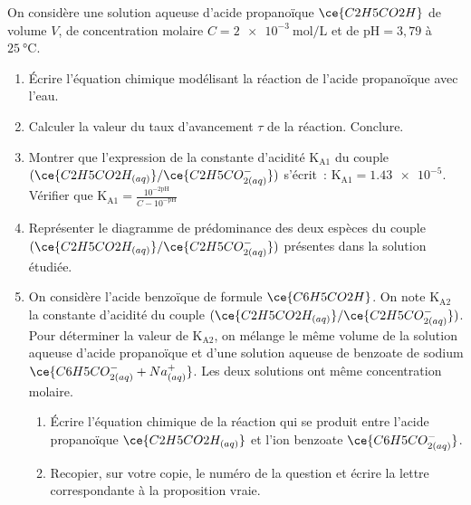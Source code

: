 On considère une solution aqueuse d'acide propanoïque $\ce{C2H5CO2H}$ de volume
$V$, de concentration molaire $C=\qty{2e-3}{\mol\per\L}$ et de
$\mathrm{pH}=3,79$ à $\qty{25}{\degreeCelsius}$.

\begin{enumerate}
    \item Écrire l'équation chimique modélisant la réaction de l'acide
          propanoïque avec l'eau.
    \item Calculer la valeur du taux d'avancement $\tau$ de la réaction.
          Conclure.
    \item Montrer que l'expression de la constante d'acidité $\mathrm{K_{A1}}$
          du couple $(\ce{C2H5CO2H_{(aq)}}/\ce{C2H5CO^-_{2(aq)}})$ s'écrit~:
          $\mathrm{K_{A1}}=\num{1.43e-5}$. Vérifier que
          $\mathrm{K_{A1}}=\frac{10^{-2\mathrm{pH}}}{C-10^{-\mathrm{pH}}}$
    \item Représenter le diagramme de prédominance des deux espèces du couple
          $(\ce{C2H5CO2H_{(aq)}}/\ce{C2H5CO^-_{2(aq)}})$ présentes dans
          la solution étudiée.
    \item On considère l'acide benzoïque de formule $\ce{C6H5CO2H}$. On
          note $\mathrm{K_{A2}}$ la constante d'acidité du couple
          $(\ce{C2H5CO2H_{(aq)}}/\ce{C2H5CO^-_{2(aq)}})$. Pour déterminer la
          valeur de $\mathrm{K_{A2}}$, on mélange le même volume de la solution
          aqueuse d'acide propanoïque et d'une solution aqueuse de benzoate de
          sodium $\ce{C6H5CO^-_{2(aq)} + Na^+_{(aq)}}$. Les deux solutions ont
          même concentration molaire.
          \begin{enumerate}
              \item Écrire l'équation chimique de la réaction qui se produit
                    entre l'acide propanoïque $\ce{C2H5CO2H_{(aq)}}$ et l'ion
                    benzoate $\ce{C6H5CO^-_{2(aq)}}$.
              \item Recopier, sur votre copie, le numéro de la question et
                    écrire la lettre correspondante à la proposition vraie.


\end{enumerate}
\end{enumerate}

